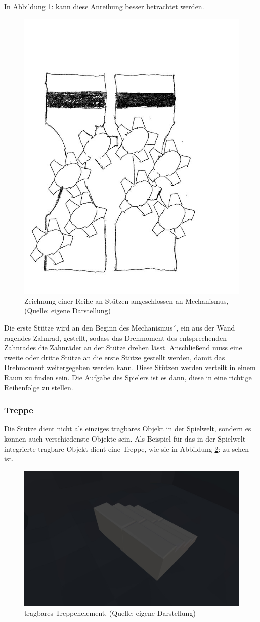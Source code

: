 In Abbildung \ref{fig:stuetze_02}:  kann diese Anreihung besser betrachtet werden.  

\begin{figure}[ht]
\centering
\includegraphics[width=0.4\linewidth]{content/pictures/Stuetze_02.jpg}
\caption{Zeichnung einer Reihe an Stützen angeschlossen an Mechanismus, (Quelle: eigene Darstellung)}
\label{fig:stuetze_02}
\end{figure}

Die erste Stütze wird an den Beginn des Mechanismus´, ein aus der Wand ragendes Zahnrad, gestellt, sodass das Drehmoment des entsprechenden Zahnrades die Zahnräder an der Stütze drehen lässt. Anschließend muss eine zweite oder dritte Stütze an die erste Stütze gestellt werden, damit das Drehmoment weitergegeben werden kann. Diese Stützen werden verteilt in einem Raum zu finden sein. Die Aufgabe des Spielers ist es dann, diese in eine richtige Reihenfolge zu stellen.

\subsubsection{Treppe}
Die Stütze dient nicht als einziges tragbares Objekt in der Spielwelt, sondern es können auch verschiedenste Objekte sein. Als Beispiel für das in der Spielwelt integrierte tragbare Objekt dient eine Treppe, wie sie in Abbildung \ref{fig:stairs}:  zu sehen ist.

\begin{figure}[ht]
\centering
\includegraphics[width=0.8\linewidth]{content/pictures/Stairs.jpg}
\caption{tragbares Treppenelement, (Quelle: eigene Darstellung)}
\label{fig:stairs}
\end{figure}

